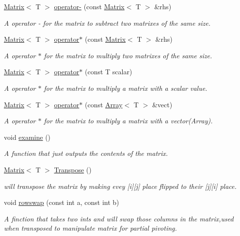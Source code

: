 \begin{DoxyCompactItemize}
\hyperlink{classMatrix}{Matrix}$<$ T $>$ \hyperlink{classMatrix_a319dffd7b66fa33d5522cbbbd129627c}{operator-\/} (const \hyperlink{classMatrix}{Matrix}$<$ T $>$ \&rhs)
\begin{DoxyCompactList}\small\item\em A operator -\/ for the matrix to subtract two matrixes of the same size. \end{DoxyCompactList}\item 
\hyperlink{classMatrix}{Matrix}$<$ T $>$ \hyperlink{classMatrix_ad8de934eb3b753e7b8ff1cd71abb9b06}{operator$\ast$} (const \hyperlink{classMatrix}{Matrix}$<$ T $>$ \&rhs)
\begin{DoxyCompactList}\small\item\em A operator $\ast$ for the matrix to multiply two matrixes of the same size. \end{DoxyCompactList}\item 
\hyperlink{classMatrix}{Matrix}$<$ T $>$ \hyperlink{classMatrix_afe1cf341d498190e42a588557c698b8b}{operator$\ast$} (const T scalar)
\begin{DoxyCompactList}\small\item\em A operator $\ast$ for the matrix to multiply a matrix with a scalar value. \end{DoxyCompactList}\item 
\hyperlink{classMatrix}{Matrix}$<$ T $>$ \hyperlink{classMatrix_a62bae2ed5e74cf6ee9b058a6d226d1c8}{operator$\ast$} (const \hyperlink{classArray}{Array}$<$ T $>$ \&vect)
\begin{DoxyCompactList}\small\item\em A operator $\ast$ for the matrix to multiply a matrix with a vector(\+Array). \end{DoxyCompactList}\item 
void \hyperlink{classMatrix_accad5ae01040ab8471031873f8065932}{examine} ()
\begin{DoxyCompactList}\small\item\em A function that just outputs the contents of the matrix. \end{DoxyCompactList}\item 
\hyperlink{classMatrix}{Matrix}$<$ T $>$ \hyperlink{classMatrix_a86d55a5db43b641f4e8fb2b302ccc599}{Transpose} ()
\begin{DoxyCompactList}\small\item\em will transpose the matrix by making evey \mbox{[}i\mbox{]}\mbox{[}j\mbox{]} place flipped to their \mbox{[}j\mbox{]}\mbox{[}i\mbox{]} place. \end{DoxyCompactList}\item 
void \hyperlink{classMatrix_acaa51eb1380038a1d524bf5bf52e3aec}{rowswap} (const int a, const int b)
\begin{DoxyCompactList}\small\item\em A finction that takes two ints and will swap those columns in the matrix,used when transposed to manipulate matrix for partial pivoting. \end{DoxyCompactList}\end{DoxyCompactItemize}
